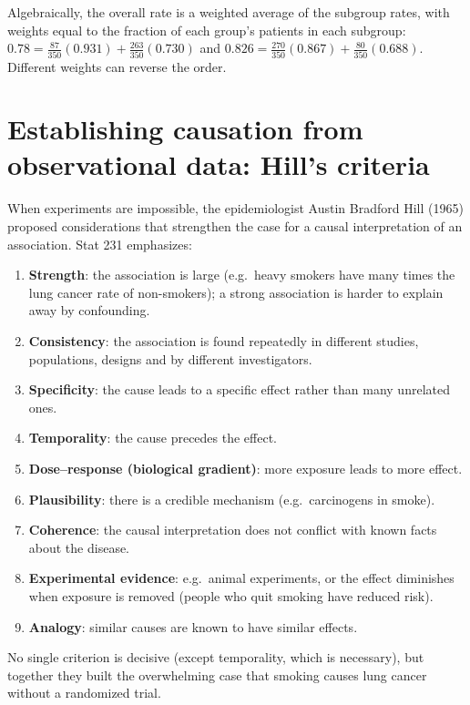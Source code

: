 \begin{remark}
Algebraically, the overall rate is a weighted average of the subgroup rates, with weights
equal to the fraction of each group's patients in each subgroup:
$0.78 = \frac{87}{350}(0.931) + \frac{263}{350}(0.730)$ and
$0.826 = \frac{270}{350}(0.867) + \frac{80}{350}(0.688)$. Different weights can reverse
the order.
\end{remark}

\section{Establishing causation from observational data: Hill's criteria}

When experiments are impossible, the epidemiologist Austin Bradford Hill (1965) proposed
considerations that strengthen the case for a causal interpretation of an association.
Stat 231 emphasizes:
\begin{enumerate}
  \item \textbf{Strength}: the association is large (e.g.\ heavy smokers have many times
        the lung cancer rate of non-smokers); a strong association is harder to explain
        away by confounding.
  \item \textbf{Consistency}: the association is found repeatedly in different studies,
        populations, designs and by different investigators.
  \item \textbf{Specificity}: the cause leads to a specific effect rather than many
        unrelated ones.
  \item \textbf{Temporality}: the cause precedes the effect.
  \item \textbf{Dose--response (biological gradient)}: more exposure leads to more
        effect.
  \item \textbf{Plausibility}: there is a credible mechanism (e.g.\ carcinogens in
        smoke).
  \item \textbf{Coherence}: the causal interpretation does not conflict with known facts
        about the disease.
  \item \textbf{Experimental evidence}: e.g.\ animal experiments, or the effect diminishes
        when exposure is removed (people who quit smoking have reduced risk).
  \item \textbf{Analogy}: similar causes are known to have similar effects.
\end{enumerate}
No single criterion is decisive (except temporality, which is necessary), but together they
built the overwhelming case that smoking causes lung cancer without a randomized trial.

